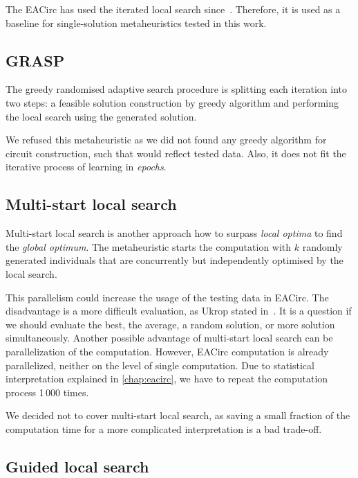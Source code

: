 \documentclass[
    digital,    %
    oneside,    %
    color,
    11pt,
    nocover,
    notable,
    nolof,
    nolot,
]{fithesis3}
\begin{document}
The EACirc has used the iterated local search since~\cite{sys2014constructing}. Therefore, it is used as a baseline for single-solution metaheuristics tested in this work.

\subsection{GRASP}
\label{subsec:opt-single-sol-grasp}

The greedy randomised adaptive search procedure is splitting each iteration into two steps: a feasible solution construction by greedy algorithm and performing the local search using the generated solution.

We refused this metaheuristic as we did not found any greedy algorithm for circuit construction, such that would reflect tested data. Also, it does not fit the iterative process of learning in \textit{epochs}.

\subsection{Multi-start local search}
\label{subsec:opt-single-sol-msls}

Multi-start local search is another approach how to surpass \textit{local optima} to find the \textit{global optimum}. The metaheuristic starts the computation with $k$ randomly generated individuals that are concurrently but independently optimised by the local search.

This parallelism could increase the usage of the testing data in EACirc. The disadvantage is a more difficult evaluation, as Ukrop stated in~\cite[Chapter~5]{ukropBcThesis}. It is a question if we should evaluate the best, the average, a random solution, or more solution simultaneously. Another possible advantage of multi-start local search can be parallelization of the computation. However, EACirc computation is already parallelized, neither on the level of single computation. Due to statistical interpretation explained in \cref{chap:eacirc}, we have to repeat the computation process 1\,000 times.

We decided not to cover multi-start local search, as saving a small fraction of the computation time for a more complicated interpretation is a bad trade-off.

\subsection{Guided local search}
\label{subsec:opt-single-sol-gls}
\end{document}

